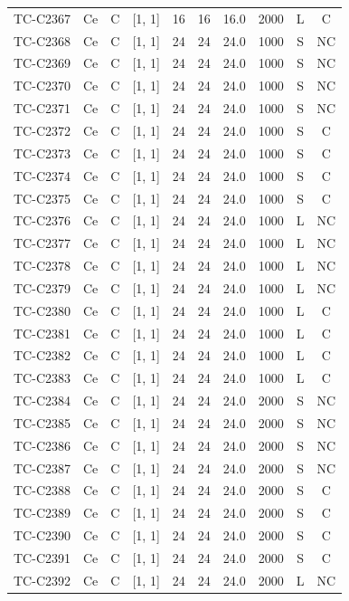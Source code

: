 \begin{longtable}{lccccccccc}
TC-C2367 & Ce & C & [1, 1] & 16 & 16 & 16.0 & 2000 & L & C \\
TC-C2368 & Ce & C & [1, 1] & 24 & 24 & 24.0 & 1000 & S & NC \\
TC-C2369 & Ce & C & [1, 1] & 24 & 24 & 24.0 & 1000 & S & NC \\
TC-C2370 & Ce & C & [1, 1] & 24 & 24 & 24.0 & 1000 & S & NC \\
TC-C2371 & Ce & C & [1, 1] & 24 & 24 & 24.0 & 1000 & S & NC \\
TC-C2372 & Ce & C & [1, 1] & 24 & 24 & 24.0 & 1000 & S & C \\
TC-C2373 & Ce & C & [1, 1] & 24 & 24 & 24.0 & 1000 & S & C \\
TC-C2374 & Ce & C & [1, 1] & 24 & 24 & 24.0 & 1000 & S & C \\
TC-C2375 & Ce & C & [1, 1] & 24 & 24 & 24.0 & 1000 & S & C \\
TC-C2376 & Ce & C & [1, 1] & 24 & 24 & 24.0 & 1000 & L & NC \\
TC-C2377 & Ce & C & [1, 1] & 24 & 24 & 24.0 & 1000 & L & NC \\
TC-C2378 & Ce & C & [1, 1] & 24 & 24 & 24.0 & 1000 & L & NC \\
TC-C2379 & Ce & C & [1, 1] & 24 & 24 & 24.0 & 1000 & L & NC \\
TC-C2380 & Ce & C & [1, 1] & 24 & 24 & 24.0 & 1000 & L & C \\
TC-C2381 & Ce & C & [1, 1] & 24 & 24 & 24.0 & 1000 & L & C \\
TC-C2382 & Ce & C & [1, 1] & 24 & 24 & 24.0 & 1000 & L & C \\
TC-C2383 & Ce & C & [1, 1] & 24 & 24 & 24.0 & 1000 & L & C \\
TC-C2384 & Ce & C & [1, 1] & 24 & 24 & 24.0 & 2000 & S & NC \\
TC-C2385 & Ce & C & [1, 1] & 24 & 24 & 24.0 & 2000 & S & NC \\
TC-C2386 & Ce & C & [1, 1] & 24 & 24 & 24.0 & 2000 & S & NC \\
TC-C2387 & Ce & C & [1, 1] & 24 & 24 & 24.0 & 2000 & S & NC \\
TC-C2388 & Ce & C & [1, 1] & 24 & 24 & 24.0 & 2000 & S & C \\
TC-C2389 & Ce & C & [1, 1] & 24 & 24 & 24.0 & 2000 & S & C \\
TC-C2390 & Ce & C & [1, 1] & 24 & 24 & 24.0 & 2000 & S & C \\
TC-C2391 & Ce & C & [1, 1] & 24 & 24 & 24.0 & 2000 & S & C \\
TC-C2392 & Ce & C & [1, 1] & 24 & 24 & 24.0 & 2000 & L & NC \\

\end{longtable}
